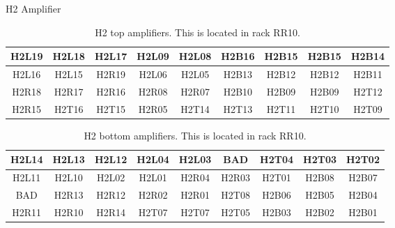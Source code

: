 \documentclass[10pt, xcolor={dvipsnames}, aspectratio = 169, sans,mathserif]{beamer}
\begin{document}
\begin{frame}{H2 Amplifier}

\begin{table}
\begin{center}
\begin{tabular}{|c|c|c|c|c|c|c|c|c|}
\hline
H2L19 & H2L18 & H2L17 & H2L09 & H2L08 & H2B16 & H2B15 & H2B15 & H2B14 \\
\hline
H2L16 & H2L15 & H2R19 & H2L06 & H2L05 & H2B13 & H2B12 & H2B12 & H2B11 \\
\hline
H2R18 & H2R17 & H2R16 & H2R08 & H2R07 & H2B10 & H2B09 & H2B09 & H2T12 \\
\hline
H2R15 & H2T16 & H2T15 & H2R05 & H2T14 & H2T13 & H2T11 & H2T10 & H2T09 \\
\hline
\end{tabular}
\caption{H2 top amplifiers. This is located in rack RR10.}
\end{center}
\end{table}

\begin{table}
\begin{center}
\begin{tabular}{|c|c|c|c|c|c|c|c|c|}
\hline
H2L14 & H2L13 & H2L12 & H2L04 & H2L03 & BAD   & H2T04 & H2T03 & H2T02 \\
\hline
H2L11 & H2L10 & H2L02 & H2L01 & H2R04 & H2R03 & H2T01 & H2B08 & H2B07 \\
\hline
BAD   & H2R13 & H2R12 & H2R02 & H2R01 & H2T08 & H2B06 & H2B05 & H2B04 \\
\hline
H2R11 & H2R10 & H2R14 & H2T07 & H2T07 & H2T05 & H2B03 & H2B02 & H2B01 \\
\hline
\end{tabular}
\caption{H2 bottom amplifiers. This is located in rack RR10.}
\end{center}
\end{table}

\end{frame}
\end{document}
